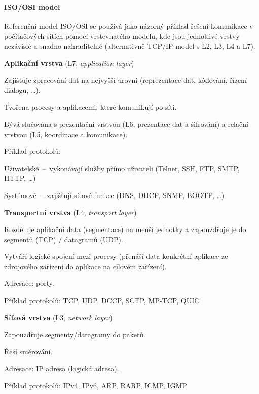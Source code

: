 \paragraph*{ISO/OSI model} Referenční model ISO/OSI se používá jako názorný příklad řešení komunikace v počítačových sítích pomocí vrstevnatého modelu, kde jsou jednotlivé vrstvy nezávislé a snadno nahraditelné (alternativně TCP/IP model s L2, L3, L4 a L7). \begin{compactitem}

    \item \textbf{Aplikační vrstva} (L7, \textit{application layer}) \begin{compactitem}
        \item Zajišťuje zpracování dat na nejvyšší úrovni (reprezentace dat, kódování, řízení dialogu, \dots).
        \item Tvořena procesy a aplikacemi, které komunikují po síti.
        \item Bývá slučována s prezentační vrstvou (L6, prezentace dat a šifrování) a relační vrstvou (L5, koordinace a komunikace).
        \item Příklad protokolů: \begin{compactitem}
            \item Uživatelské~--~vykonávají služby přímo uživateli (Telnet, SSH, FTP, SMTP, HTTP, \dots)
            \item Systémové~--~zajišťují síťové funkce (DNS, DHCP, SNMP, BOOTP, \dots)
        \end{compactitem}
    \end{compactitem}

    \item \textbf{Transportní vrstva} (L4, \textit{transport layer}) \begin{compactitem}
        \item Rozděluje aplikační data (segmentace) na menší jednotky a zapouzdřuje je do segmentů (TCP) / datagramů (UDP).
        \item Vytváří logické spojení mezi procesy (přenáší data konkrétní aplikace ze zdrojového zařízení do aplikace na cílovém zařízení).
        \item Adresace: porty.
        \item Příklad protokolů: TCP, UDP, DCCP, SCTP, MP-TCP, QUIC
    \end{compactitem}

    \item \textbf{Síťová vrstva} (L3, \textit{network layer}) \begin{compactitem}
        \item Zapouzdřuje segmenty/datagramy do paketů.
        \item Řeší směrování.
        \item Adresace: IP adresa (logická adresa).
        \item Příklad protokolů: IPv4, IPv6, ARP, RARP, ICMP, IGMP
    \end{compactitem}


\end{compactitem}
